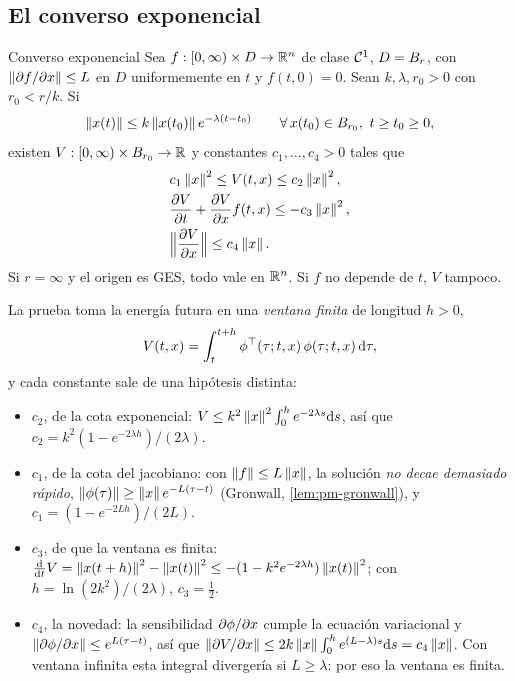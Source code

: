 
\subsection{El converso exponencial}

\begin{teorema}[label=thm:av-converso]{Converso exponencial \citep[Teo.~4.14]{Kha02}}
Sea $f:[0,\infty)\times D\to\mathbb{R}^n$ de clase $\mathcal{C}^{1}$, $D=B_{r}$, con $\left\lVert \partial f/\partial x\right\rVert\le L$ en $D$ uniformemente en $t$ y $f(t,0)=0$. Sean $k,\lambda,r_0>0$ con $r_0<r/k$. Si
\[
  \norm{x(t)}\le k\norm{x(t_0)}e^{-\lambda(t-t_0)}\qquad\forall\,x(t_0)\in\Bola{r_0},\ t\ge t_0\ge0,
\]
existen $V:[0,\infty)\times B_{r_0}\to\mathbb{R}$ y constantes $c_1,\dots,c_4>0$ tales que
\begin{align}
  &c_1\left\lVert x\right\rVert^2\le V(t,x)\le c_2\left\lVert x\right\rVert^2, \label{eq:av-conv1}\\
  &\frac{\partial V}{\partial t}+\frac{\partial V}{\partial x}f(t,x)\le-c_3\left\lVert x\right\rVert^2, \label{eq:av-conv2}\\
  &\Bigl\|\frac{\partial V}{\partial x}\Bigr\|\le c_4\left\lVert x\right\rVert . \label{eq:av-conv3}
\end{align}
Si $r=\infty$ y el origen es GES, todo vale en $\mathbb{R}^n$. Si $f$ no depende de $t$, $V$ tampoco.
\end{teorema}

La prueba toma la energía futura en una \emph{ventana finita} de longitud $h>0$,
\begin{equation}
  V(t,x)=\int_t^{t+h}\phi^{\top}(\tau;t,x)\,\phi(\tau;t,x)\,\mathrm{d}\tau ,
  \label{eq:av-Vconverso}
\end{equation}
y cada constante sale de una hipótesis distinta:
\begin{itemize}
  \item $c_2$, de la cota exponencial: $V\le k^2\left\lVert x\right\rVert^2\int_0^he^{-2\lambda s}\mathrm{d} s$, así que $c_2=k^2(1-e^{-2\lambda h})/(2\lambda)$.
  \item $c_1$, de la cota del jacobiano: con $\left\lVert f\right\rVert\le L\left\lVert x\right\rVert$, la solución \emph{no decae demasiado rápido}, $\left\lVert \phi(\tau)\right\rVert\ge\left\lVert x\right\rVert e^{-L(\tau-t)}$ (Gronwall, \cref{lem:pm-gronwall}), y $c_1=(1-e^{-2Lh})/(2L)$.
  \item $c_3$, de que la ventana es finita: $\frac{\mathrm{d}}{\mathrm{d} t}V=\left\lVert x(t+h)\right\rVert^2-\left\lVert x(t)\right\rVert^2\le-(1-k^2e^{-2\lambda h})\left\lVert x(t)\right\rVert^2$; con $h=\ln(2k^2)/(2\lambda)$, $c_3=\tfrac12$.
  \item $c_4$, la novedad: la sensibilidad $\partial\phi/\partial x$ cumple la ecuación variacional y $\left\lVert \partial\phi/\partial x\right\rVert\le e^{L(\tau-t)}$, así que $\left\lVert \partial V/\partial x\right\rVert\le2k\left\lVert x\right\rVert\int_0^he^{(L-\lambda)s}\mathrm{d} s=c_4\left\lVert x\right\rVert$. Con ventana infinita esta integral divergería si $L\ge\lambda$: por eso la ventana es finita.
\end{itemize}

